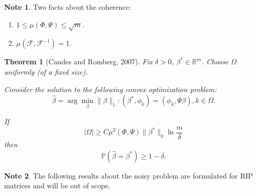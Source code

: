 \documentclass[11pt]{article}
\numberwithin{equation}{section}
\newtheorem{theorem}{Theorem}[section]
\theoremstyle{definition}
\newtheorem{remark}{Note}[section]
\begin{document}
{\begin{remark}
    Two facts about the coherence:
    \begin{enumerate}
        \item $ 1 \leq \mu(\Phi, \Psi) \leq \sqrt m $.
        \item $\mu(\mathcal F, \mathcal F^{-1}) = 1$.
    \end{enumerate}
\end{remark}

\begin{theorem}[Candes and Romberg, 2007]
    Fix $\delta > 0$, $\beta^* \in \mathbb R^m$.
    Choose $\Omega$ uniformly (of a fixed size).

    Consider the solution to the following convex optimization problem:
    $$ \hat \beta = \arg \min_\beta \|\beta\|_1: (\beta^*, \phi_k) = (\phi_k, \Psi \beta), k \in \Omega. $$
    
    If
    $$ |\Omega| \ge C \mu^2(\Phi, \Psi) \|\beta^*\|_0 \ln \frac{m}{\delta} $$
    then
    $$ \mathbb P(\hat \beta = \beta^*) \ge 1 - \delta. $$
\end{theorem}

\begin{remark}
    The following results about the noisy problem are formulated for RIP matrices and will be out of scope.
\end{remark}
}
\end{document}
